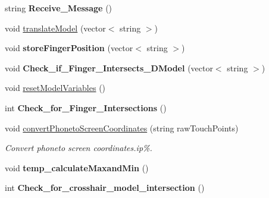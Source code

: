 \begin{DoxyCompactItemize}
\item 
\hypertarget{classtest_app_a9388efd101d9850bdf41ed036861e369}{string {\bfseries Receive\-\_\-\-Message} ()}\label{classtest_app_a9388efd101d9850bdf41ed036861e369}

\item 
void \hyperlink{classtest_app_a8afafb31eb516994348caaf54bdea6bb}{translate\-Model} (vector$<$ string $>$)
\item 
\hypertarget{classtest_app_aff620776a9cf806d8555de9a501fdcee}{void {\bfseries store\-Finger\-Position} (vector$<$ string $>$)}\label{classtest_app_aff620776a9cf806d8555de9a501fdcee}

\item 
\hypertarget{classtest_app_a5631a4b034f1558b451fed3868480222}{void {\bfseries Check\-\_\-if\-\_\-\-Finger\-\_\-\-Intersects\-\_\-D\-Model} (vector$<$ string $>$)}\label{classtest_app_a5631a4b034f1558b451fed3868480222}

\item 
void \hyperlink{classtest_app_ac374af2c9d11d72f27d79e16f3902b95}{reset\-Model\-Variables} ()
\item 
\hypertarget{classtest_app_a2397b9317004e36fb25ca77bb7f99d50}{int {\bfseries Check\-\_\-for\-\_\-\-Finger\-\_\-\-Intersections} ()}\label{classtest_app_a2397b9317004e36fb25ca77bb7f99d50}

\item 
void \hyperlink{classtest_app_af4304932dc358f431608e54b243f74e5}{convert\-Phoneto\-Screen\-Coordinates} (string raw\-Touch\-Points)
\begin{DoxyCompactList}\small\item\em Convert phoneto screen coordinates.ip\%. \end{DoxyCompactList}\item 
\hypertarget{classtest_app_ae813833c1d2e4917d75984d1828f0c30}{void {\bfseries temp\-\_\-calculate\-Maxand\-Min} ()}\label{classtest_app_ae813833c1d2e4917d75984d1828f0c30}

\item 
\hypertarget{classtest_app_acff4b4d2d795806c8586f83602457ed7}{int {\bfseries Check\-\_\-for\-\_\-crosshair\-\_\-model\-\_\-intersection} ()}\label{classtest_app_acff4b4d2d795806c8586f83602457ed7}

\end{DoxyCompactItemize}
